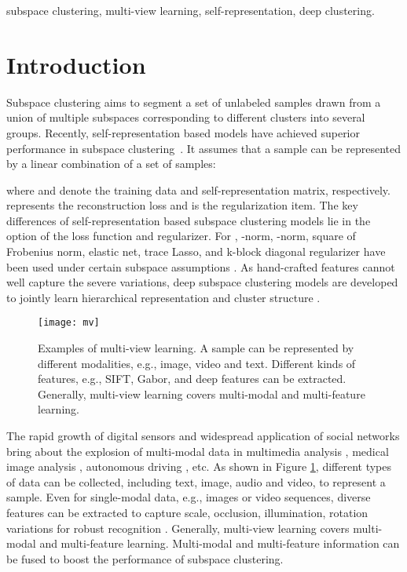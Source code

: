\documentclass[journal]{IEEEtran}
\begin{document}
\begin{IEEEkeywords}
subspace clustering, multi-view learning, self-representation, deep clustering.
\end{IEEEkeywords}


\section{Introduction}
Subspace clustering aims to segment a set of unlabeled samples drawn from a union of multiple subspaces corresponding to different clusters into several groups.
Recently, self-representation based models have achieved superior performance in subspace clustering~\cite{Guangcan2013Robust,ji2017deep,Zhou2018DeepAS}. It assumes that a sample can be represented by a linear combination of a set of samples:

where  and  denote the training data and self-representation matrix, respectively.
 represents the reconstruction loss and  is the regularization item.
The key differences of self-representation based subspace clustering models lie in the option of the loss function and regularizer.
For , -norm, -norm, square of Frobenius norm, elastic net, trace Lasso, and k-block diagonal regularizer have been used under certain subspace assumptions \cite{Lu2018Subspace}.
As hand-crafted features cannot well capture the severe variations, deep subspace clustering models are developed to jointly learn hierarchical representation and cluster structure \cite{Chen2017UnsupervisedMC,Tian2017DeepClusterAG,Jiang2018WhenTL,Zhou2018DeepAS,Peng2018StructuredAF,Guo2017ImprovedDE,Li2017ProjectiveLS,Chellappa2018DeepDC,Liang2018SubGANAU,Lezama2018OLEOL}.  

\begin{figure}
	\centering
	\texttt{[image: mv]}
	\caption{Examples of multi-view learning.
A sample can be represented by different modalities, e.g., image, video and text.
Different kinds of features, e.g., SIFT, Gabor, and deep features can be extracted.
Generally, multi-view learning covers multi-modal and multi-feature learning. }
	\label{mv}
\end{figure}

The rapid growth of digital sensors and widespread application of social networks bring about the explosion of multi-modal data in multimedia analysis \cite{luo2017simple}, medical image analysis \cite{kim2015dasc}, autonomous driving \cite{chen2017multi}, etc.
As shown in Figure \ref{mv}, different types of data can be collected, including text, image, audio and video, to represent a sample.
Even for single-modal data, e.g., images or video sequences, diverse features can be extracted to capture scale, occlusion, illumination, rotation variations for robust recognition \cite{Zhao2017MultiViewCV}.
Generally, multi-view learning covers multi-modal and multi-feature learning.
Multi-modal and multi-feature information can be fused to boost the performance of subspace clustering.
\end{document}
